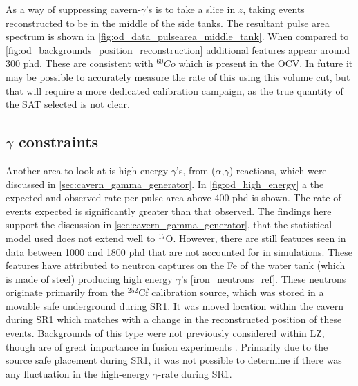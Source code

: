 \par
As a way of suppressing cavern-$\gamma$'s is to take a slice in $z$, taking events reconstructed to be in the middle of the side tanks.
The resultant pulse area spectrum is shown in \autoref{fig:od_data_pulsearea_middle_tank}.
When compared to \autoref{fig:od_backgrounds_position_reconstruction} additional features appear around 300 phd.
These are consistent with ${}^{60}Co$ which is present in the OCV.
In future it may be possible to accurately measure the rate of this using this volume cut, but that will require a more dedicated calibration campaign, as the true quantity of the SAT selected is not clear.




\subsection{$\gamma$ constraints}
\par
Another area to look at is high energy $\gamma$'s, from ($\alpha$,$\gamma$) reactions, which were discussed in \autoref{sec:cavern_gamma_generator}.
In \autoref{fig:od_high_energy} a the expected and observed rate per pulse area above 400 phd is shown.
The rate of events expected is significantly greater than that observed.
The findings here support the discussion in \autoref{sec:cavern_gamma_generator}, that the statistical model used does not extend well to ${}^{17}$O.
However, there are still features seen in data between 1000 and 1800 phd that are not accounted for in simulations.
These features have attributed to neutron captures on the Fe of the water tank (which is made of steel) producing high energy $\gamma$'s \autoref{iron_neutrons_ref}.
These neutrons originate primarily from the ${}^{252}$Cf calibration source, which was stored in a movable safe underground during SR1.
It was moved location within the cavern during SR1 which matches with a change in the reconstructed position of these events.
Backgrounds of this type were not previously considered within LZ, though are of great importance in fusion experiments \cite{iter_neutrons_ref}.
Primarily due to the source safe placement during SR1, it was not possible to determine if there was any fluctuation in the high-energy $\gamma$-rate during SR1.




